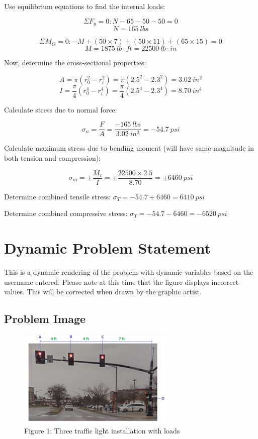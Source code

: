 \documentclass[
  letterpaper,
  DIV=11,
  numbers=noendperiod]{scrreprt}
\begin{document}
Use equilibrium equations to find the internal loads:

\[
\Sigma F_y=0: N-65-50-50=0
\] \[N=165~lbs
\]

\[
\Sigma M_O=0: -M+(50\times7)+(50\times11)+(65\times15)=0
\] \[
M=1875~lb\cdot ft=22500~lb\cdot in
\]

Now, determine the cross-sectional properties:

\[
A=\pi(r_0^2-r_i^2)=\pi(2.5^2-2.3^2)=3.02~in^2
\] \[
I=
\frac{\pi}{4}
(r_0^4-r_i^4)=\frac{\pi}{4}(2.5^4-2.3^4)=8.70~in^4
\]

Calculate stress due to normal force:

\[
\sigma_n=\frac{F}{A}=\frac{-165~lbs}{3.02~in^2}=-54.7~psi
\]

Calculate maximum stress due to bending moment (will have same magnitude
in both tension and compression):

\[
\sigma_m=\pm\frac{M_c}{I}=\pm\frac{22500\times2.5}{8.70}=\pm6460~psi
\]

Determine combined tensile stress: \(\sigma_T=-54.7+6460=6410~psi\)

Determine combined compressive stress: \(\sigma_T=-54.7-6460=-6520~psi\)

\chapter*{Dynamic Problem Statement}\label{dynamic-problem-statement}


This is a dynamic rendering of the problem with dynamic variables based
on the username entered. Please note at this time that the figure
displays incorrect values. This will be corrected when drawn by the
graphic artist.

\section*{Problem Image}\label{problem-image}


\begin{figure}[H]

{\centering \includegraphics{images/stoplights.png}

}

\caption{Figure 1: Three traffic light installation with loads}

\end{figure}%
\end{document}
